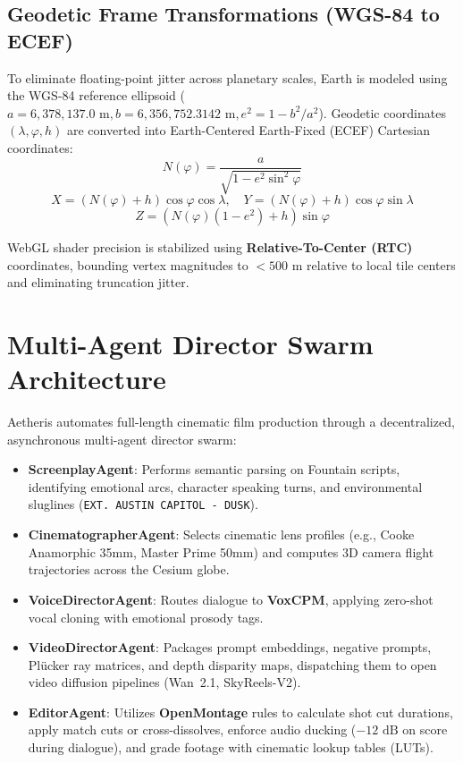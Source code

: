 \documentclass[10pt,twocolumn,letterpaper]{article}
\begin{document}
\subsection{Geodetic Frame Transformations (WGS-84 to ECEF)}

To eliminate floating-point jitter across planetary scales, Earth is modeled using the WGS-84 reference ellipsoid ($a = 6,378,137.0\text{ m}, b = 6,356,752.3142\text{ m}, e^2 = 1 - b^2/a^2$). Geodetic coordinates $(\lambda, \varphi, h)$ are converted into Earth-Centered Earth-Fixed (ECEF) Cartesian coordinates:
\begin{equation}
N(\varphi) = \frac{a}{\sqrt{1 - e^2 \sin^2 \varphi}}
\end{equation}
\begin{equation}
X = (N(\varphi) + h) \cos \varphi \cos \lambda, \quad Y = (N(\varphi) + h) \cos \varphi \sin \lambda
\end{equation}
\begin{equation}
Z = \left(N(\varphi)(1 - e^2) + h\right) \sin \varphi
\end{equation}

WebGL shader precision is stabilized using \textbf{Relative-To-Center (RTC)} coordinates, bounding vertex magnitudes to $< 500\text{ m}$ relative to local tile centers and eliminating truncation jitter.

\section{Multi-Agent Director Swarm Architecture}

Aetheris automates full-length cinematic film production through a decentralized, asynchronous multi-agent director swarm:
\begin{itemize}
    \item \textbf{ScreenplayAgent}: Performs semantic parsing on Fountain scripts, identifying emotional arcs, character speaking turns, and environmental sluglines (\texttt{EXT. AUSTIN CAPITOL - DUSK}).
    \item \textbf{CinematographerAgent}: Selects cinematic lens profiles (e.g., Cooke Anamorphic 35mm, Master Prime 50mm) and computes 3D camera flight trajectories across the Cesium globe.
    \item \textbf{VoiceDirectorAgent}: Routes dialogue to \textbf{VoxCPM}, applying zero-shot vocal cloning with emotional prosody tags.
    \item \textbf{VideoDirectorAgent}: Packages prompt embeddings, negative prompts, Pl\"ucker ray matrices, and depth disparity maps, dispatching them to open video diffusion pipelines (Wan~2.1, SkyReels-V2).
    \item \textbf{EditorAgent}: Utilizes \textbf{OpenMontage} rules to calculate shot cut durations, apply match cuts or cross-dissolves, enforce audio ducking ($-12\text{ dB}$ on score during dialogue), and grade footage with cinematic lookup tables (LUTs).
\end{itemize}
\end{document}
